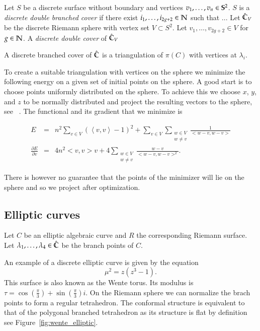 \documentclass[Thesis.tex]{subfiles}
\begin{document}
\begin{definition}
Let $S$ be a discrete surface without boundary and vertices
$v_1,\ldots,v_n\in\S^2$. $S$ is a \emph{discrete double branched cover} if
there exist $i_1,\ldots, i_{2g+2}\in \N$ such that ...  Let $\Chat_V$ be the discrete Riemann sphere with vertex set
$V\subset S^2$. Let $v_1, \ldots,v_{2g+2} \in V$ for $g\in \N$. A
\emph{discrete double cover} of $\Chat_V$ \end{definition}

A discrete branched cover of $\Chat$ is a triangulation of $\pi(C)$ with
vertices at $\lambda_i$.


To create a suitable triangulation with vertices on the sphere we minimize the
following energy on a given set of initial points on the sphere. A good start
is to choose points uniformly distributed on the sphere. To achieve this we
choose $x$, $y$, and $z$ to be normally distributed and project the resulting
vectors to the sphere, see~ \cite{Muller1959}. The functional and its gradient
that we minimize is

\begin{eqnarray*}
	E &=& n^2\sum_{v\in V}\left( \left<v,v\right> - 1\right)^2 + \sum_{v\in
V}\sum_{\substack{w\in V\\w\neq v}} \frac{1}{<w-v, w-v>}\\ \frac{\partial
E}{\partial v} &=& 4n^2<v,v>v + 4\sum_{\substack{w\in V\\w\neq
v}}\frac{w-v}{<w-v,w-v>^2}.  \end{eqnarray*}

There is however no guarantee that the points of the minimizer will lie on the
sphere and so we project after optimization.


\subsection{Elliptic curves}
\label{sec:examples_elliptic}

Let $C$ be an elliptic algebraic curve and $R$ the corresponding Riemann
surface. Let $\lambda_1, \ldots, \lambda_4 \in \Chat$ be the branch points of
$C$. 

\begin{example}
\label{ex:wente_elliptic}
An example of a discrete elliptic curve is given by the equation
\begin{equation} \mu^2=z(z^3-1).  \end{equation} This surface is also known as
the Wente torus. Its modulus is
$\tau=\cos(\frac{\pi}{3})+\sin(\frac{\pi}{3})i$. On the Riemann sphere we can
normalize the brach points to form a regular tetrahedron. The conformal
structure is equivalent to that of the polygonal branched tetrahedron as its
structure is flat by definition see Figure~\ref{fig:wente_elliptic}.
\end{example}
\end{document}
